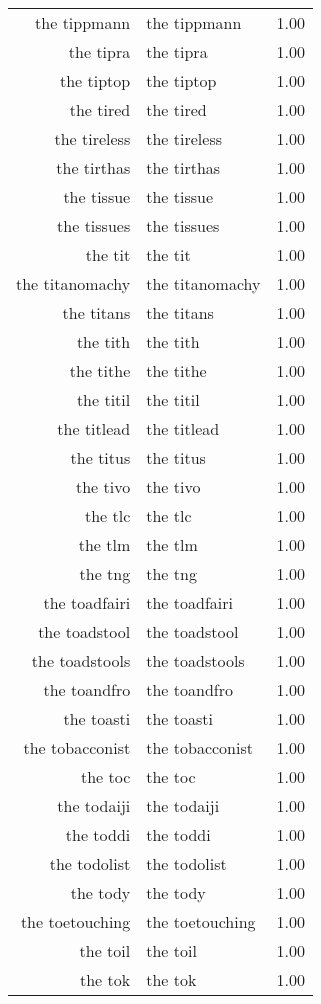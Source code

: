 \begin{table}[ht]
\begin{tabular}{rlr}
  the tippmann & the tippmann & 1.00 \\ 
  the tipra & the tipra & 1.00 \\ 
  the tiptop & the tiptop & 1.00 \\ 
  the tired & the tired & 1.00 \\ 
  the tireless & the tireless & 1.00 \\ 
  the tirthas & the tirthas & 1.00 \\ 
  the tissue & the tissue & 1.00 \\ 
  the tissues & the tissues & 1.00 \\ 
  the tit & the tit & 1.00 \\ 
  the titanomachy & the titanomachy & 1.00 \\ 
  the titans & the titans & 1.00 \\ 
  the tith & the tith & 1.00 \\ 
  the tithe & the tithe & 1.00 \\ 
  the titil & the titil & 1.00 \\ 
  the titlead & the titlead & 1.00 \\ 
  the titus & the titus & 1.00 \\ 
  the tivo & the tivo & 1.00 \\ 
  the tlc & the tlc & 1.00 \\ 
  the tlm & the tlm & 1.00 \\ 
  the tng & the tng & 1.00 \\ 
  the toadfairi & the toadfairi & 1.00 \\ 
  the toadstool & the toadstool & 1.00 \\ 
  the toadstools & the toadstools & 1.00 \\ 
  the toandfro & the toandfro & 1.00 \\ 
  the toasti & the toasti & 1.00 \\ 
  the tobacconist & the tobacconist & 1.00 \\ 
  the toc & the toc & 1.00 \\ 
  the todaiji & the todaiji & 1.00 \\ 
  the toddi & the toddi & 1.00 \\ 
  the todolist & the todolist & 1.00 \\ 
  the tody & the tody & 1.00 \\ 
  the toetouching & the toetouching & 1.00 \\ 
  the toil & the toil & 1.00 \\ 
  the tok & the tok & 1.00 \\ 

\end{tabular}
\end{table}
